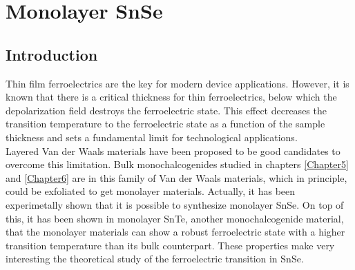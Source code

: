 
\chapter{Monolayer SnSe} %

\label{Chapter7} %




\section{Introduction}

Thin film ferroelectrics are the key for modern device applications\cite{lallart2011ferroelectrics}. However, it is 
known that there is a critical thickness for thin ferroelectrics, below which the depolarization field destroys the 
ferroelectric state\cite{batra1973new,zhong1994giant,dawber2005physics}. This effect decreases the transition 
temperature to the ferroelectric state as a function of the sample 
thickness\cite{fong2004ferroelectricity,fong2006stabilization} and sets a fundamental limit for technological  
applications. \\

Layered Van der Waals materials have been proposed to be good candidates to overcome this 
limitation\cite{shirodkar2014emergence,fei2016ferroelectricity}. 
Bulk monochalcogenides studied in chapters \ref{Chapter5} and \ref{Chapter6} are in this family of Van der Waals 
materials, which in principle, could be exfoliated to get monolayer materials. Actually, it has been experimetally 
shown that it is possible to synthesize monolayer SnSe\cite{li2013single,zhao2015controlled}. On top of this, it has 
been shown in monolayer SnTe, another monochalcogenide material, that the monolayer materials can show a robust 
ferroelectric state with a higher transition temperature than its bulk counterpart\cite{chang2016discovery}. These 
properties make very interesting the theoretical study of the ferroelectric transition in SnSe. \\

